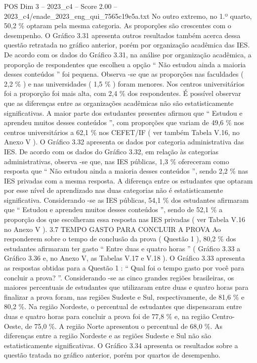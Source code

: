 \begin{textsample}{POS Dim 3 – 2023\_c4 – Score 2.00 – 2023\_c4/enade\_2023\_eng\_qui\_7565c19e5a.txt}
No outro extremo, no 1.º quarto, 50,2 \% optaram pela mesma categoria.
As proporções são crescentes com o desempenho.
O Gráfico 3.31 apresenta outros resultados também acerca dessa questão retratada no gráfico anterior, porém por organização acadêmica das IES.
De acordo com os dados do Gráfico 3.31, na análise por organização acadêmica, a proporção de respondentes que escolheu a opção “ Não estudou ainda a maioria desses conteúdos ” foi pequena.
Observa -se que as proporções nas faculdades ( 2,2 \% ) e nas universidades ( 1,5 \% ) foram menores.
Nos centros universitários foi a proporção foi mais alta, com 2,4 \% dos respondentes.
É possível observar que as diferenças entre as organizações acadêmicas não são estatisticamente significativas.
A maior parte dos estudantes presentes afirmou que “ Estudou e aprendeu muitos desses conteúdos ”, com proporções que variam de 49,6 \% nos centros universitários a 62,1 \% nos CEFET/IF ( ver também Tabela V.16, no Anexo V ).
O Gráfico 3.32 apresenta os dados por categoria administrativa das IES.
De acordo com os dados do Gráfico 3.32, em relação às categorias administrativas, observa -se que, nas IES públicas, 1,3 \% ofereceram como resposta que “ Não estudou ainda a maioria desses conteúdos ”, sendo 2,2 \% nas IES privadas com a mesma resposta.
A diferença entre os estudantes que optaram por esse nível de aprendizado nas duas categorias não é estatisticamente significativa.
Considerando -se as IES públicas, 54,1 \% dos estudantes afirmaram que “ Estudou e aprendeu muitos desses conteúdos ”, sendo de 52,1 \% a proporção dos que escolheram essa resposta nas IES privadas ( ver Tabela V.16 no Anexo V ). 3.7 TEMPO GASTO PARA CONCLUIR A PROVA Ao responderem sobre o tempo de conclusão da prova ( Questão 1 ), 80,2 \% dos estudantes afirmaram ter gasto “ Entre duas e quatro horas ” ( Gráfico 3.33 a Gráfico 3.36 e, no Anexo V, as Tabelas V.17 e V.18 ).
O Gráfico 3.33 apresenta as respostas obtidas para a Questão 1 : “ Qual foi o tempo gasto por você para concluir a prova? ”.
Considerando -se as cinco grandes regiões brasileiras, os maiores percentuais de estudantes que utilizaram entre duas e quatro horas para finalizar a prova foram, nas regiões Sudeste e Sul, respectivamente, de 81,6 \% e 80,2 \%.
Na região Nordeste, o percentual de estudantes que dispensaram entre duas e quatro horas para concluir a prova foi de 77,8 \% e, na região Centro-Oeste, de 75,0 \%.
A região Norte apresentou o percentual de 68,0 \%.
As diferenças entre a região Nordeste e as regiões Sudeste e Sul não são estatisticamente significativas.
O Gráfico 3.34 apresenta os resultados sobre a questão tratada no gráfico anterior, porém por quartos de desempenho.

\end{textsample}

